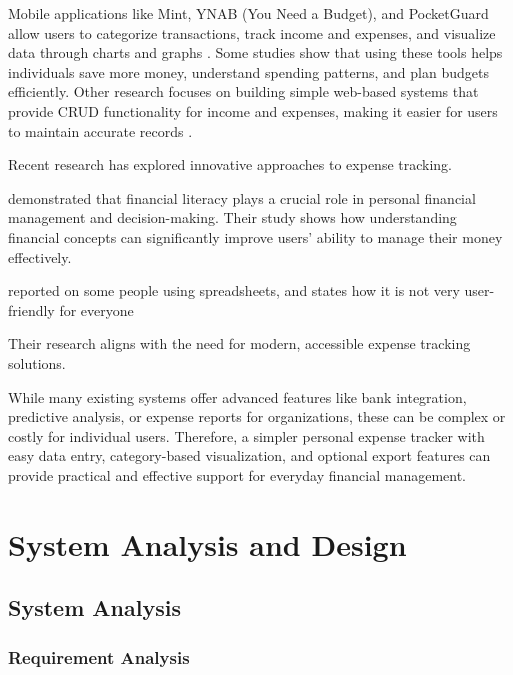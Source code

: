 \documentclass[12pt]{report}
\begin{document}
Mobile applications like Mint, YNAB (You Need a Budget), and PocketGuard allow users to categorize transactions, track income and expenses, and visualize data through charts and graphs \cite{chandini2019online}. Some studies show that using these tools helps individuals save more money, understand spending patterns, and plan budgets efficiently. Other research focuses on building simple web-based systems that provide CRUD functionality for income and expenses, making it easier for users to maintain accurate records \cite{verma2024research}.

\noindent
Recent research has explored innovative approaches to expense tracking.

\cite{verma2024research} demonstrated that financial literacy plays a crucial role in personal financial management and decision-making. Their study shows how understanding financial concepts can significantly improve users' ability to manage their money effectively.

\cite{manchanda2012expense} reported on some people using spreadsheets, and states how it is not very user-friendly for everyone

\noindent
Their research aligns with the need for modern, accessible expense tracking solutions.

While many existing systems offer advanced features like bank integration, predictive analysis, or expense reports for organizations, these can be complex or costly for individual users. Therefore, a simpler personal expense tracker with easy data entry, category-based visualization, and optional export features can provide practical and effective support for everyday financial management.

\newpage
\chapter{System Analysis and Design}

\section{System Analysis}

\subsection{Requirement Analysis}
\end{document}
